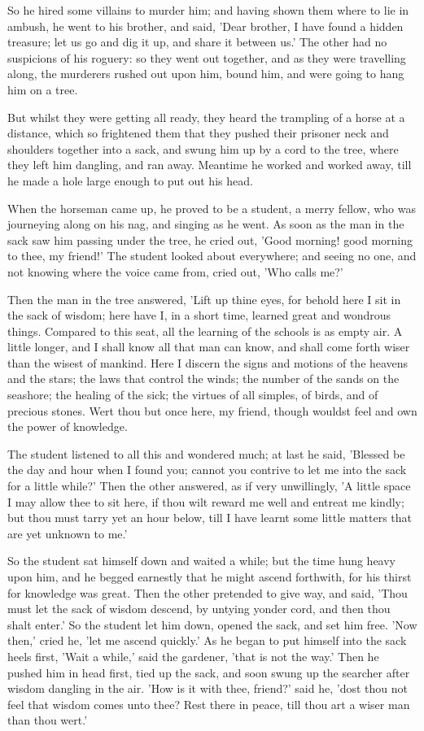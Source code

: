 \documentclass[12pt]{book}
\begin{document}
So he hired some villains to murder him; and having shown them where
to lie in ambush, he went to his brother, and said, 'Dear brother, I
have found a hidden treasure; let us go and dig it up, and share it
between us.' The other had no suspicions of his roguery: so they went
out together, and as they were travelling along, the murderers rushed
out upon him, bound him, and were going to hang him on a tree.

But whilst they were getting all ready, they heard the trampling of a
horse at a distance, which so frightened them that they pushed their
prisoner neck and shoulders together into a sack, and swung him up by
a cord to the tree, where they left him dangling, and ran away.
Meantime he worked and worked away, till he made a hole large enough
to put out his head.

When the horseman came up, he proved to be a student, a merry fellow,
who was journeying along on his nag, and singing as he went. As soon
as the man in the sack saw him passing under the tree, he cried out,
'Good morning! good morning to thee, my friend!' The student looked
about everywhere; and seeing no one, and not knowing where the voice
came from, cried out, 'Who calls me?'

Then the man in the tree answered, 'Lift up thine eyes, for behold
here I sit in the sack of wisdom; here have I, in a short time,
learned great and wondrous things. Compared to this seat, all the
learning of the schools is as empty air. A little longer, and I shall
know all that man can know, and shall come forth wiser than the wisest
of mankind. Here I discern the signs and motions of the heavens and
the stars; the laws that control the winds; the number of the sands on
the seashore; the healing of the sick; the virtues of all simples, of
birds, and of precious stones. Wert thou but once here, my friend,
though wouldst feel and own the power of knowledge.

The student listened to all this and wondered much; at last he said,
'Blessed be the day and hour when I found you; cannot you contrive to
let me into the sack for a little while?' Then the other answered, as
if very unwillingly, 'A little space I may allow thee to sit here, if
thou wilt reward me well and entreat me kindly; but thou must tarry
yet an hour below, till I have learnt some little matters that are yet
unknown to me.'

So the student sat himself down and waited a while; but the time hung
heavy upon him, and he begged earnestly that he might ascend
forthwith, for his thirst for knowledge was great. Then the other
pretended to give way, and said, 'Thou must let the sack of wisdom
descend, by untying yonder cord, and then thou shalt enter.' So the
student let him down, opened the sack, and set him free. 'Now then,'
cried he, 'let me ascend quickly.' As he began to put himself into the
sack heels first, 'Wait a while,' said the gardener, 'that is not the
way.' Then he pushed him in head first, tied up the sack, and soon
swung up the searcher after wisdom dangling in the air. 'How is it
with thee, friend?' said he, 'dost thou not feel that wisdom comes
unto thee? Rest there in peace, till thou art a wiser man than thou
wert.'
\end{document}
